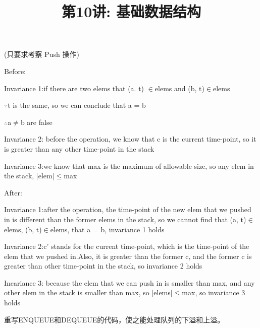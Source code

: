 \documentclass[a4paper, justified]{tufte-handout}
\title{第10讲: 基础数据结构}
\date{\zhtoday} %
\begin{document}
\maketitle
\noplagiarism %
\begin{abstract}
\end{abstract}
\beginrequired

\begin{problem}[MA 2.6]
(只要求考察 Push 操作)
\end{problem}

\begin{solution}
  Before:

  Invariance 1:if there are two elems that (a. t) $\in$elems and (b, t)$\in$elems

  $\because$t is the same, so we can conclude that a = b

  $\therefore$a$\ne$b are false

  Invariance 2: before the operation, we know that c is the current time-point, so it is greater than any other time-point in the stack

  Invariance 3:we know that max is the maximum of allowable size, so any elem in the stack, |elem|$\le$max

  After:

  Invariance 1:after the operation, the time-point of the new elem that we  pushed in is different than the former elems in the stack, so we cannot find that (a, t)$\in$elems, (b, t)$\in$elems, that a = b, invariance 1 holds

  Invariance 2:c' stands for the current time-point, which is the time-point of the elem that we pushed in.Also, it is greater than the former c, and the former c is greater than other time-point in the stack, so invariance 2 holds

  Incariance 3: because the elem that we can push in is smaller than max, and any other elem in the stack is smaller than max, so |elems|$\le$max, so invariance 3 holds
\end{solution}


\begin{problem}[TC 10.1-4]
重写ENQUEUE和DEQUEUE的代码，使之能处理队列的下溢和上溢。
\end{problem}
\end{document}
